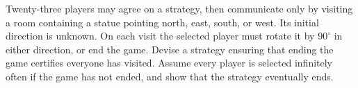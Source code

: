 Twenty-three players may agree on a strategy, then communicate only by visiting a room containing a statue pointing north, east, south, or west. Its initial direction is unknown. On each visit the selected player must rotate it by $90^\circ$ in either direction, or end the game. Devise a strategy ensuring that ending the game certifies everyone has visited. Assume every player is selected infinitely often if the game has not ended, and show that the strategy eventually ends.

